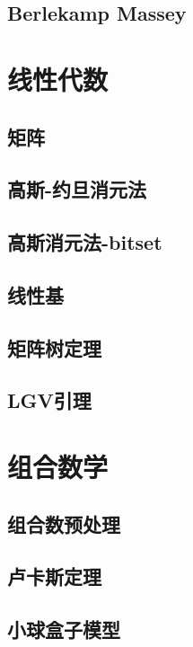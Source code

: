 \documentclass{article}
\begin{document}
\subsection{Berlekamp Massey}


\section{线性代数}
\subsection{矩阵}
\subsection{高斯-约旦消元法}

\subsection{高斯消元法-bitset}

\subsection{线性基}

\subsection{矩阵树定理}

\subsection{LGV引理}


\section{组合数学}
\subsection{组合数预处理}

\subsection{卢卡斯定理}
\subsection{小球盒子模型}
\end{document}
